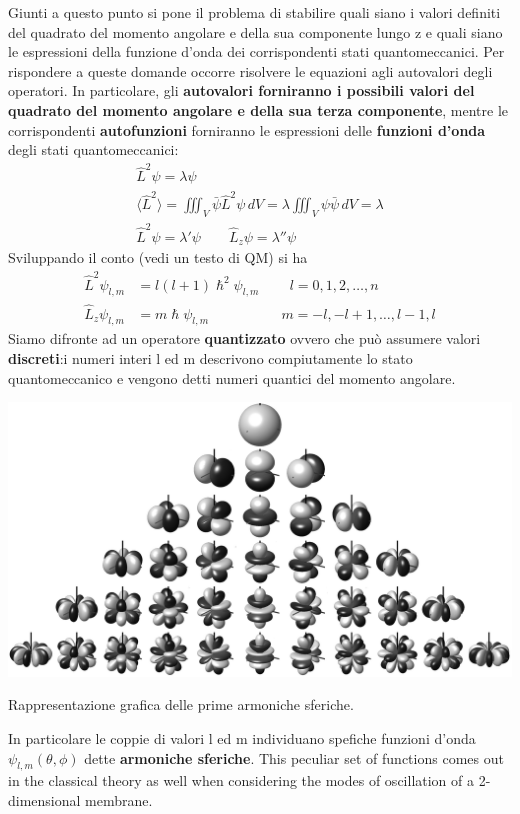 Giunti a questo punto si pone il problema di stabilire quali siano i
valori definiti del quadrato del momento angolare e della sua componente
lungo z e quali siano le espressioni della funzione d'onda dei
corrispondenti stati quantomeccanici.
Per rispondere a queste domande
occorre risolvere le equazioni agli autovalori degli operatori.
In
particolare, gli \textbf{autovalori forniranno i possibili valori del
quadrato del momento angolare e della sua terza componente}, mentre le
corrispondenti \textbf{autofunzioni} forniranno le espressioni delle
\textbf{funzioni d'onda} degli stati quantomeccanici: \begin{gather*}
                                                          \hat{L}^{2}\psi = \lambda \psi\\
                                                          \langle \hat{L}^{2}\rangle = \iiint_{V} \bar{\psi} \hat{L}^{2}\psi \, dV = \lambda \iiint_{V} \psi \bar{\psi} \, dV = \lambda\\
                                                          \hat{L}^{2} \psi = \lambda' \psi \qquad  \hat{L}_{z} \psi = \lambda'' \psi
\end{gather*}
Sviluppando il conto (vedi un testo di QM) si ha
\begin{align*}
    \hat{L}^{2}\psi_{l,m} &= l(l+1) \hslash^{2} \psi_{l,m} \qquad  \, l = 0,1,2, \dots , n\\
    \hat{L}_{z} \psi_{l,m} &= m \hslash \psi_{l,m} \qquad  \qquad \quad \, m = -l,-l + 1, \dots ,l-1, l
\end{align*} Siamo difronte ad un operatore \textbf{quantizzato} ovvero che può
assumere valori \textbf{discreti}:i numeri interi l ed m descrivono
compiutamente lo stato quantomeccanico e vengono detti numeri quantici
del momento angolare.\\
\begin{marginfigure}
    \includegraphics{figs/spherical-harmonics}
    \caption{Rappresentazione grafica delle prime armoniche sferiche.}
    \label{fig:spherical-harmonics}
\end{marginfigure}
In particolare le coppie di valori l ed m individuano spefiche funzioni
d'onda \(\psi_{l,m}(\theta,\phi)\) dette \textbf{armoniche sferiche}.
This peculiar set of functions comes out in the classical theory as well
when considering the modes of oscillation of a 2-dimensional membrane.

